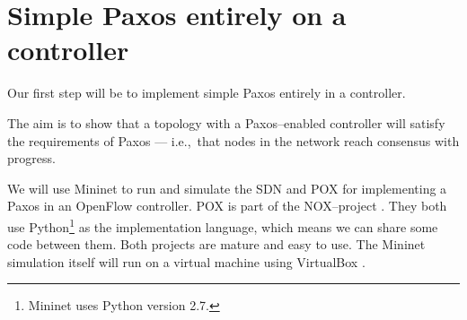 \chapter{Simple Paxos entirely on a controller}

Our first step will be to implement simple Paxos \cite{Lam01} entirely in a
controller.

The aim is to show that a topology with a Paxos--enabled controller will
satisfy the requirements of Paxos --- i.e.,~that nodes in the network reach
consensus with progress.

We will use Mininet \cite{Lantz:2010:NLR:1868447.1868466} to run and
simulate the \ac{SDN} and POX \cite{POX.1} for implementing a Paxos in an
OpenFlow controller.  POX is part of the NOX--project
\cite{Gude:2008:NTO:1384609.1384625}.  They both use Python\footnote{Mininet
uses Python version 2.7.} \cite{vanRossum:2009:PRM:1610526} as the
implementation language, which means we can share some code between them.
Both projects are mature and easy to use.  The Mininet simulation itself
will run on a virtual machine using VirtualBox
\cite{Watson:2008:VBB:1344209.1344210}.
